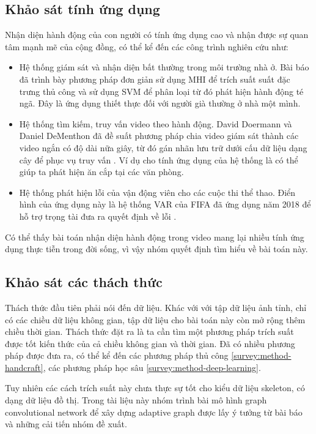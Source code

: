 \subsection{Khảo sát tính ứng dụng}

Nhận diện hành động của con người có tính ứng dụng cao và nhận được sự quan tâm mạnh mẽ của cộng đồng, có thể kể đến các công trình nghiên cứu như:

\begin{itemize}
    \item Hệ thống giám sát và nhận diện bất thường trong môi trường nhà ở. Bài báo \cite{gunale2019intelligent} đã trình bày phương pháp đơn giản sử dụng MHI để trích suất suất đặc trưng thủ công và sử dụng SVM để phân loại từ đó phát hiện hành động té ngã. Đây là ứng dụng thiết thực đối với người già thường ở nhà một mình.
    \item Hệ thống tìm kiếm, truy vấn video theo hành động. David Doermann và Daniel DeMenthon đã đề suất phương pháp chia video giám sát thành các video ngắn có độ dài nữa giây, từ đó gán nhãn lưu trữ dưới cấu dữ liệu dạng cây để phục vụ truy vấn \cite{lin2012human}. Ví dụ cho tính ứng dụng của hệ thống là có thể giúp ta phát hiện ăn cắp tại các văn phòng.
    \item Hệ thống phát hiện lỗi của vận động viên cho các cuộc thi thể thao. Điển hình của ứng dụng này là hệ thống VAR của FIFA đã ứng dụng năm 2018 để  hỗ trợ trọng tài đưa ra quyết định về lỗi \cite{petersen2019var}.
\end{itemize}

Có thể thấy bài toán nhận diện hành động trong video mang lại nhiều tính ứng dụng thực tiễn trong đời sống, vì vậy nhóm quyết định tìm hiểu về bài toán này.

\subsection{Khảo sát các thách thức}

Thách thức đầu tiên phải nói đến dữ liệu. Khác với với tập dữ liệu ảnh tỉnh, chỉ có các chiều dữ liệu không gian, tập dữ liệu cho bài toán này còn mở rộng thêm chiều thời gian. Thách thức đặt ra là ta cần tìm một phương pháp trích suất được tốt kiến thức của cả chiều không gian và thời gian. Đã có nhiều phương pháp được đưa ra, có thể  kể đến các phương pháp thủ công \ref{survey:method-handcraft}, các phương pháp học sâu \ref{survey:method-deep-learning}.

Tuy nhiên các cách trích suất này chưa thực sự tốt cho kiểu dữ liệu skeleton, có dạng dữ liệu đồ thị. Trong tài liệu này nhóm trình bài mô hình graph convolutional network để xây dựng adaptive graph được lấy ý tưởng từ bài báo \cite{shi2020skeleton} và những cải tiến nhóm đề xuất.

